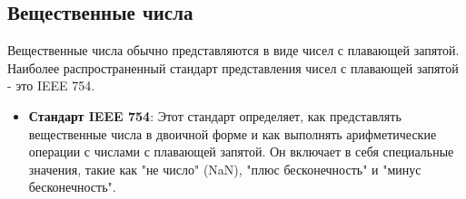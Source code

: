 \subsection{Вещественные числа}

Вещественные числа обычно представляются в виде чисел с плавающей запятой. Наиболее распространенный стандарт представления чисел с плавающей запятой - это IEEE 754. 

\begin{itemize}
\item \textbf{Стандарт IEEE 754}: Этот стандарт определяет, как представлять вещественные числа в двоичной форме и как выполнять арифметические операции с числами с плавающей запятой. Он включает в себя специальные значения, такие как "не число" (NaN), "плюс бесконечность" и "минус бесконечность".
\end{itemize}

